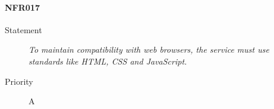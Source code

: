 \paragraph{NFR017}
\begin{description}
  \item [Statement] \textit{To maintain compatibility with web browsers, the service must use standards like \gls{HTML}, \gls{CSS} and \gls{JavaScript}.}
  \item [Priority] A
\end{description}
